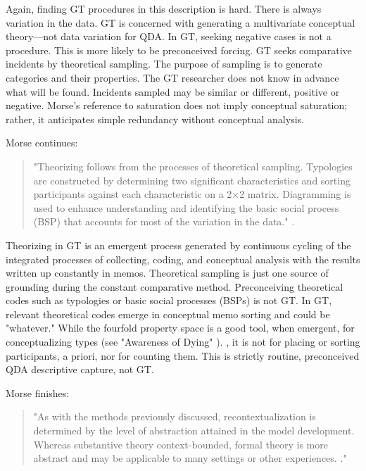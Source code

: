 Again, finding GT procedures in this description is hard. 
There is always variation in the data. 
GT is concerned with generating a multivariate conceptual theory—not data variation for QDA.
In GT, seeking negative cases is not a procedure. 
This is more likely to be preconceived forcing. 
GT seeks comparative incidents by theoretical sampling. 
The purpose of sampling is to generate categories and their properties. The GT researcher does not know in advance what will be found. 
Incidents sampled may be similar or different, positive or negative.
Morse’s reference to saturation does not imply conceptual saturation; rather, it anticipates simple redundancy without conceptual analysis.

Morse continues:

\begin{quote}
"Theorizing follows from the processes of theoretical sampling.
Typologies are constructed by determining two significant characteristics and sorting participants against each characteristic on a 2×2 matrix.
Diagramming is used to enhance understanding and identifying the
basic social process (BSP) that accounts for most of the variation in the
data."
\citep[p. 39]{incollection.morse94}.
\end{quote}

Theorizing in GT is an emergent process generated by continuous cycling of the integrated processes of collecting, coding, and conceptual analysis with the results written up constantly in memos. 
Theoretical sampling is just one source of grounding during the constant comparative method. 
Preconceiving theoretical codes such as typologies or basic social processes (BSPs) is not GT. 
In GT, relevant theoretical codes emerge in conceptual memo sorting and could be "whatever." 
While the fourfold property space is a good tool, when emergent, for conceptualizing types 
(see "Awareness of Dying" \citep{book.glaser65}).
, it is not for placing or sorting participants, a priori, nor for counting them. 
This is strictly routine, preconceived QDA descriptive capture, not GT.

Morse finishes:

\begin{quote}
"As with the methods previously discussed, recontextualization is determined by the level of abstraction attained in the model development. 
Whereas substantive theory context-bounded, formal theory is more abstract and may be applicable to many settings or other experiences.
\citep[p. 39]{incollection.morse94}."
\end{quote}

